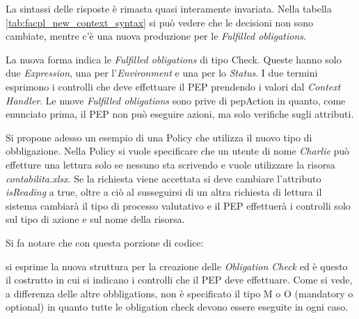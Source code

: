 La sintassi delle risposte è rimasta quasi interamente invariata. Nella tabella \ref{tab:facpl_new_context_syntax}
si può vedere che le decisioni non sono cambiate, mentre c'è una nuova produzione per le \emph{Fulfilled obligations}.

La nuova forma indica le \emph{Fulfilled obligations} di tipo Check. Queste hanno solo due \emph{Expression}, una per
l'\emph{Environment} e una per lo \emph{Status}. I due termini esprimono i controlli che deve effettuare il \ac{PEP}
prendendo i valori dal \emph{Context Handler}. Le nuove \emph{Fulfilled obligations} sono prive di pepAction in quanto,
come enunciato prima, il \ac{PEP} non può eseguire azioni, ma solo verifiche sugli attributi.\par
\vspace{3mm}
Si propone adesso un esempio di una Policy che utilizza il nuovo tipo di obbligazione.
Nella Policy si vuole specificare che un utente di nome \emph{Charlie} può effetture una lettura solo se nessuno sta scrivendo
e vuole utilizzare la risorsa \emph{contabilita.xlsx}.
Se la richiesta viene accettata si deve cambiare l'attributo \emph{isReading} a true, oltre a ciò al susseguirsi
di un altra richiesta di lettura il sistema cambiarà il tipo di processo valutativo e il \ac{PEP} effettuerà i controlli
solo sul tipo di azione e sul nome della risorsa.\par

\newpage

\vspace{1em}
Si fa notare che con questa porzione di codice:

\vspace{1em}
si esprime la nuova struttura per la creazione delle \emph{Obligation Check} ed è questo il costrutto
in cui si indicano i controlli che il \ac{PEP} deve effettuare. Come si vede, a differenza delle altre
obbligations, non è specificato il tipo M o O (mandatory o optional) in quanto tutte le obligation check
devono essere eseguite in ogni caso.
\clearpage
